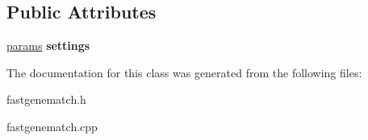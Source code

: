 \subsection*{Public Attributes}
\begin{DoxyCompactItemize}
\item 
\hypertarget{classfastgenematch_1_1Genematcher_ad79b2b34f9b424f29e4ecc6bfe7bfefb}{
\hyperlink{structfastgenematch_1_1Genematch__converter_1_1params}{params} {\bfseries settings}}
\label{classfastgenematch_1_1Genematcher_ad79b2b34f9b424f29e4ecc6bfe7bfefb}

\end{DoxyCompactItemize}


The documentation for this class was generated from the following files:\begin{DoxyCompactItemize}
\item 
fastgenematch.h\item 
fastgenematch.cpp\end{DoxyCompactItemize}
